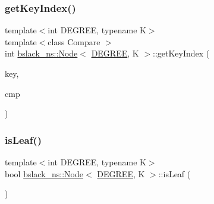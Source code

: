 \subsubsection{\texorpdfstring{get\+Key\+Index()}{getKeyIndex()}}
{\footnotesize\ttfamily template$<$int D\+E\+G\+R\+EE, typename K$>$ \\
template$<$class Compare $>$ \\
int \hyperlink{structbslack__ns_1_1Node}{bslack\+\_\+ns\+::\+Node}$<$ \hyperlink{brown__sigouin__abtree__kcas_2adapter_8h_a5d88b17d70c985f2f2b8e987037fd6dd}{D\+E\+G\+R\+EE}, K $>$\+::get\+Key\+Index (\begin{DoxyParamCaption}\item[{const K \&}]{key,  }\item[{Compare}]{cmp }\end{DoxyParamCaption})\hspace{0.3cm}{\ttfamily [inline]}}

\mbox{\label{structbslack__ns_1_1Node_a0be34de40eb688fdce9c6df52405a359}} 
\subsubsection{\texorpdfstring{is\+Leaf()}{isLeaf()}}
{\footnotesize\ttfamily template$<$int D\+E\+G\+R\+EE, typename K$>$ \\
bool \hyperlink{structbslack__ns_1_1Node}{bslack\+\_\+ns\+::\+Node}$<$ \hyperlink{brown__sigouin__abtree__kcas_2adapter_8h_a5d88b17d70c985f2f2b8e987037fd6dd}{D\+E\+G\+R\+EE}, K $>$\+::is\+Leaf (\begin{DoxyParamCaption}{ }\end{DoxyParamCaption})\hspace{0.3cm}{\ttfamily [inline]}}

\mbox{\label{structbslack__ns_1_1Node_a97d7ff7f4384cee00e12b11731bf03fe}} 
